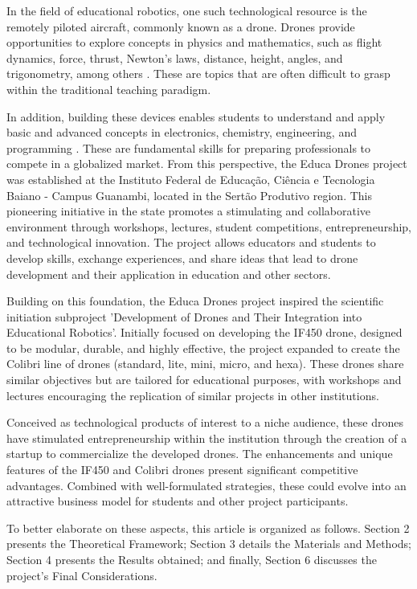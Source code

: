 \documentclass[conference]{IEEEtran}
\begin{document}
In the field of educational robotics, one such technological resource is the remotely piloted aircraft, commonly known as a drone. Drones provide opportunities to explore concepts in physics and mathematics, such as flight dynamics, force, thrust, Newton’s laws, distance, height, angles, and trigonometry, among others \cite{b11}. These are topics that are often difficult to grasp within the traditional teaching paradigm.

In addition, building these devices enables students to understand and apply basic and advanced concepts in electronics, chemistry, engineering, and programming \cite{b12}. These are fundamental skills for preparing professionals to compete in a globalized market. From this perspective, the Educa Drones project was established at the Instituto Federal de Educação, Ciência e Tecnologia Baiano - Campus Guanambi, located in the Sertão Produtivo region. This pioneering initiative in the state promotes a stimulating and collaborative environment through workshops, lectures, student competitions, entrepreneurship, and technological innovation. The project allows educators and students to develop skills, exchange experiences, and share ideas that lead to drone development and their application in education and other sectors.

Building on this foundation, the Educa Drones project inspired the scientific initiation subproject 'Development of Drones and Their Integration into Educational Robotics'. Initially focused on developing the IF450 drone, designed to be modular, durable, and highly effective, the project expanded to create the Colibri line of drones (standard, lite, mini, micro, and hexa). These drones share similar objectives but are tailored for educational purposes, with workshops and lectures encouraging the replication of similar projects in other institutions.

Conceived as technological products of interest to a niche audience, these drones have stimulated entrepreneurship within the institution through the creation of a startup to commercialize the developed drones. The enhancements and unique features of the IF450 and Colibri drones present significant competitive advantages. Combined with well-formulated strategies, these could evolve into an attractive business model for students and other project participants.

To better elaborate on these aspects, this article is organized as follows. Section 2 presents the Theoretical Framework; Section 3 details the Materials and Methods; Section 4 presents the Results obtained; and finally, Section 6 discusses the project's Final Considerations.
\end{document}

